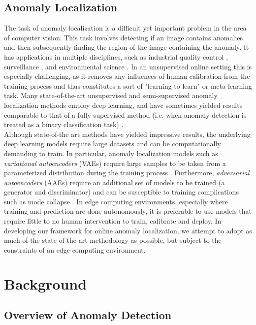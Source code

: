 \documentclass[12pt]{article}
\begin{document}
\subsection{Anomaly Localization}
The task of anomaly localization is a difficult yet important problem in the area of computer vision. This task involves detecting if an image contains anomalies and then subsequently finding the region of the image containing the anomaly. It has applications in multiple disciplines, such as industrial quality control \cite{}, surveillance \cite{}, and environmental science \cite{}. In an unsupervised online setting this is especially challenging, as it removes any influences of human calibration from the training process and thus constitutes a sort of "learning to learn" or meta-learning task. Many state-of-the-art unsupervised and semi-supervised anomaly localization methods employ deep learning, and have sometimes yielded results comparable to that of a fully supervised method (i.e. when anomaly detection is treated as a binary classification task) \cite{attention_anomalies}.\\

Although state-of-the art methods have yielded impressive results, the underlying deep learning models require large datasets and can be computationally demanding to train. In particular, anomaly localization models such as \textit{variational autoencoders} (VAEs) require large samples to be taken from a parameterized distribution during the training process \cite{avb_model}. Furthermore, \textit{adversarial autoencoders} (AAEs) require an additional set of models to be trained (a generator and discriminator) and can be susceptible to training complications such as mode collapse \cite{kumar_mask_aae, avb_model}. In edge computing environments, especially where training and prediction are done autonomously, it is preferable to use models that require little to no human intervention to train, calibrate and deploy. In developing our framework for online anomaly localization, we attempt to adopt as much of the state-of-the art methodology as possible, but subject to the constraints of an edge computing environment.



\section{Background}
\subsection{Overview of Anomaly Detection}
\end{document}
